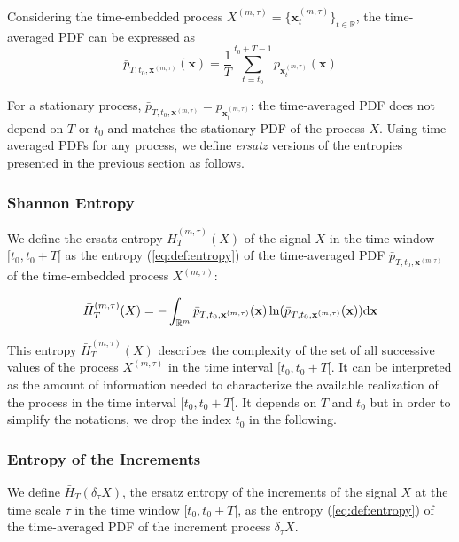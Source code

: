 \documentclass[aps,pra,groupedaddress,notitlepage]{revtex4-1}
\begin{document}
Considering the time-embedded process $X^{(m,\tau)}=\{\textbf{x}_t^{(m,\tau)}\}_{t\in\mathbb{R}}$, the time-averaged PDF can be expressed as
\begin{equation}
\bar p_{T, t_0, \textbf{x}^{(m,\tau)}}(\textbf{x}) = \frac{1}{T} \sum_{t=t_{0}}^{t_{0}+T-1} p_{\textbf{x}^{(m,\tau)}_{t}}(\textbf{x}) %
\end{equation}

For a stationary process, $\bar{p}_{T, t_0, \textbf{x}^{(m,\tau)}} = p_{\textbf{x}_t^{(m,\tau)}}$: the time-averaged PDF does not depend on $T$ or $t_0$ and matches the stationary PDF of the process $X$.
%
Using time-averaged PDFs for any process, we define {\em ersatz} versions of the entropies presented in the previous section as follows. 


\subsubsection{{Shannon} Entropy}
We define the ersatz entropy $\bar{H}^{(m,\tau)}_{T}(X)$ of the signal $X$ in the time window $[t_0, t_0+T[$ as the entropy (\ref{eq:def:entropy}) of the time-averaged PDF $\bar p_{T,t_0, \textbf{x}^{(m,\tau)}}$ of the time-embedded process $X^{(m,\tau)}$:

\begin{equation}\label{eq:HT}
\bar{H}_{T}^{(m,\tau)}(X)=-\int_{\mathbb{R}^{m}} \bar p_{T,t_0, \textbf{x}^{(m,\tau)}}(\textbf{x}) \ln(\bar p_{T,t_0, \textbf{x}^{(m,\tau)}}(\textbf{x})) {\rm d}\textbf{x}
\end{equation}

This entropy $\bar{H}_{T}^{(m,\tau)}(X)$ describes the complexity of the set of all successive values of the process $X^{(m,\tau)}$ in the time interval $[t_0, t_0+T[$. It can be interpreted as the amount of information needed to characterize the available realization of the process in the time interval $[t_0, t_0+T[$. It depends on $T$ and $t_0$ but in order to simplify the notations, we drop the index $t_0$ in the following. 


\subsubsection{{Entropy} of the Increments}
We define $\bar{H}_T(\delta_\tau X)$, the ersatz entropy of the increments of the signal $X$ at the time scale $\tau$ in the time window $[t_0, t_0+T[$, as the entropy (\ref{eq:def:entropy}) of the time-averaged PDF of the increment process $\delta_\tau X$.
\end{document}
